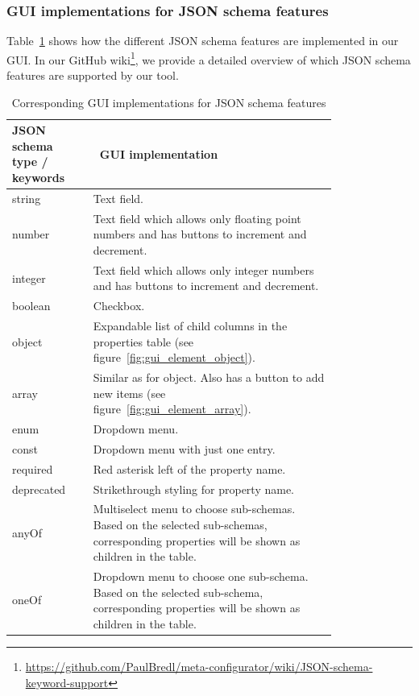 \subsubsection{GUI implementations for JSON schema features} %
Table~\ref{table:json_schema_type_component} shows how the different JSON schema features are implemented in our GUI\@.
In our GitHub wiki\footnote{\url{https://github.com/PaulBredl/meta-configurator/wiki/JSON-schema-keyword-support}}, we provide a detailed overview of which JSON schema features are supported by our tool.

\begin{table}[htb]
    \centering
    \caption{Corresponding GUI implementations for JSON schema features\label{table:json_schema_type_component}}
    \begin{tabular}{@{}p{0.2\linewidth}p{0.6\linewidth}@{}}
        \toprule
        \textbf{JSON schema type / keywords} & \textbf{\ GUI implementation} \\
        \midrule
        string & Text field. \\
        number & Text field which allows only floating point numbers and has buttons to increment and decrement. \\
        integer & Text field which allows only integer numbers and has buttons to increment and decrement. \\
        boolean & Checkbox.\\
        object & Expandable list of child columns in the properties table (see figure~\ref{fig:gui_element_object}). \\
        array & Similar as for object.
        Also has a button to add new items (see figure~\ref{fig:gui_element_array}).\\
        enum & Dropdown menu.\\
        const & Dropdown menu with just one entry.\\
        required & Red asterisk left of the property name.\\
        deprecated & Strikethrough styling for property name.\\
        anyOf & Multiselect menu to choose sub-schemas.
        Based on the selected sub-schemas, corresponding properties will be shown as children in the table.\\
        oneOf & Dropdown menu to choose one sub-schema.
        Based on the selected sub-schema, corresponding properties will be shown as children in the table.\\
        \bottomrule
    \end{tabular}
\end{table}


